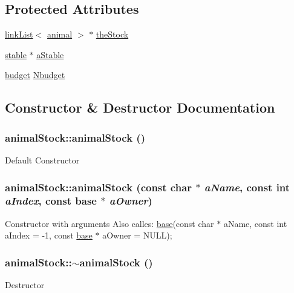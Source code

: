 \subsection*{Protected Attributes}
\begin{DoxyCompactItemize}
\item 
\hyperlink{classlink_list}{linkList}$<$ \hyperlink{classanimal}{animal} $>$ $\ast$ \hyperlink{classanimal_stock_ad953b662fecba40e83dd04350ed2189f}{theStock}
\item 
\hyperlink{classstable}{stable} $\ast$ \hyperlink{classanimal_stock_a3f463dfdca4991f4555581e8d2a7e6c0}{aStable}
\item 
\hyperlink{classbudget}{budget} \hyperlink{classanimal_stock_ae28046254cae05a55efe5dbe41baeeab}{Nbudget}
\end{DoxyCompactItemize}


\subsection{Constructor \& Destructor Documentation}
\hypertarget{classanimal_stock_a28ef4328fb75f96b307966450326d947}{
\subsubsection[{animalStock}]{\setlength{\rightskip}{0pt plus 5cm}animalStock::animalStock ()}}
\label{classanimal_stock_a28ef4328fb75f96b307966450326d947}
Default Constructor \hypertarget{classanimal_stock_adf6f3e6e99c71676689dbbdf5b6e1ba3}{
\subsubsection[{animalStock}]{\setlength{\rightskip}{0pt plus 5cm}animalStock::animalStock (const char $\ast$ {\em aName}, \/  const int {\em aIndex}, \/  const {\bf base} $\ast$ {\em aOwner})}}
\label{classanimal_stock_adf6f3e6e99c71676689dbbdf5b6e1ba3}
Constructor with arguments Also calles: \hyperlink{classbase}{base}(const char $\ast$ aName, const int aIndex = -\/1, const \hyperlink{classbase}{base} $\ast$ aOwner = NULL); \hypertarget{classanimal_stock_a1b348cc4923dedf82ed04e3c65feb405}{
\subsubsection[{$\sim$animalStock}]{\setlength{\rightskip}{0pt plus 5cm}animalStock::$\sim$animalStock ()}}
\label{classanimal_stock_a1b348cc4923dedf82ed04e3c65feb405}
Destructor 

